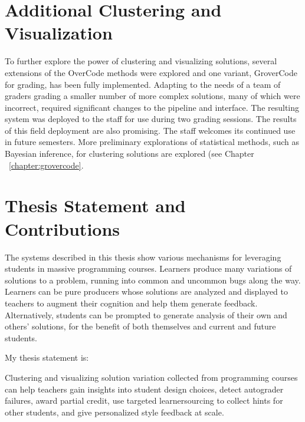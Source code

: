 \section{Additional Clustering and Visualization}

To further explore the power of clustering and visualizing solutions, several extensions of the OverCode methods were explored and one variant, GroverCode for grading, has been fully implemented. Adapting to the needs of a team of graders grading a smaller number of more complex solutions, many of which were incorrect, required significant changes to the pipeline and interface. The resulting system was deployed to the staff for use during two grading sessions. The results of this field deployment are also promising. The staff welcomes its continued use in future semesters. More preliminary explorations of statistical methods, such as Bayesian inference, for clustering solutions are explored (see Chapter ~\ref{chapter:grovercode}.



\section{Thesis Statement and Contributions}

The systems described in this thesis show various mechanisms for leveraging students in massive programming courses. Learners produce many variations of solutions to a problem, running into common and uncommon bugs along the way. Learners can be pure producers whose solutions are analyzed and displayed to teachers to augment their cognition and help them generate feedback. Alternatively, students can be prompted to generate analysis of their own and others' solutions, for the benefit of both themselves and current and future students. %

My thesis statement is: 
\begin{displayquote}
Clustering and visualizing solution variation collected from programming courses can help teachers gain insights into student design choices, detect autograder failures, award partial credit, use targeted learnersourcing to collect hints for other students, and give personalized style feedback at scale.
\end{displayquote}

